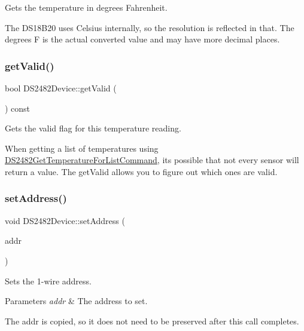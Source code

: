 Gets the temperature in degrees Fahrenheit. 

The D\+S18\+B20 uses Celsius internally, so the resolution is reflected in that. The degrees F is the actual converted value and may have more decimal places. \mbox{\label{class_d_s2482_device_a50eeb974bc88c7f2a1c3133a9f1cf8bb}} 
\subsubsection{\texorpdfstring{get\+Valid()}{getValid()}}
{\footnotesize\ttfamily bool D\+S2482\+Device\+::get\+Valid (\begin{DoxyParamCaption}{ }\end{DoxyParamCaption}) const\hspace{0.3cm}{\ttfamily [inline]}}



Gets the valid flag for this temperature reading. 

When getting a list of temperatures using \mbox{\hyperlink{class_d_s2482_get_temperature_for_list_command}{D\+S2482\+Get\+Temperature\+For\+List\+Command}}, it\textquotesingle{}s possible that not every sensor will return a value. The get\+Valid allows you to figure out which ones are valid. \mbox{\label{class_d_s2482_device_a97f56684da4d9b9670d21041e5da15f4}} 
\subsubsection{\texorpdfstring{set\+Address()}{setAddress()}}
{\footnotesize\ttfamily void D\+S2482\+Device\+::set\+Address (\begin{DoxyParamCaption}\item[{const \mbox{\hyperlink{class_d_s24821_wire_address}{D\+S24821\+Wire\+Address}} \&}]{addr }\end{DoxyParamCaption})\hspace{0.3cm}{\ttfamily [inline]}}



Sets the 1-\/wire address. 


\begin{DoxyParams}{Parameters}
{\em addr} & The address to set.\\
\hline
\end{DoxyParams}
The addr is copied, so it does not need to be preserved after this call completes. \mbox{\label{class_d_s2482_device_af1891adba72138aa522b258cc6d4026e}} 
